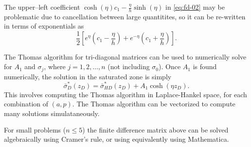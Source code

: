 \documentclass[12pt,letterpaper]{article}
\begin{document}
The upper--left coefficient $\cosh(\eta)c_1 - \frac{\eta}{h}\sinh(\eta)$ in
\eqref{eq:fd-02} may be problematic due to cancellation between large
quantitites, so it can be re-written in terms of exponentials as 
\begin{equation}
 \nonumber
 \frac{1}{2} \left[ e^{\eta} \left( c_1 - \frac{\eta}{h}\right) + e^{-\eta}
   \left( c_1 + \frac{\eta}{h}\right) \right].
\end{equation}

The Thomas algorithm for tri-diagonal matrices can be used to
numerically solve for $A_1$ and $\sigma_j$, where $j=1,2, \dots, n$
(not including $\sigma_0$).  Once $A_1$ is found numerically, the
solution in the saturated zone is simply 
\begin{equation}
 \nonumber
 \bar{\sigma}^{\ast}_{D}(z_D) = \bar{\sigma}^{\ast}_{HD}(z_D) + A_1
 \cosh(\eta z_D).
\end{equation}
This involves computing the Thomas algorithm in Laplace-Hankel space,
for each combination of $(a,p)$.  The Thomas algorithm can be
vectorized to compute many solutions simulataneously.

For small problems ($n \le 5$) the finite difference matrix above can
be solved algebraically using Cramer's rule, or using equivalently
using Mathematica.  



\end{document}
